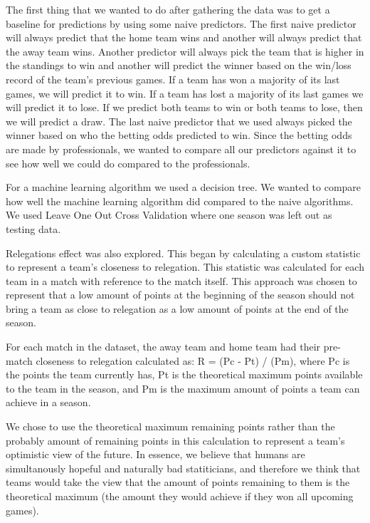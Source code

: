 \documentclass[conference]{IEEEtran}
\begin{document}
The first thing that we wanted to do after gathering the data was to get a baseline for predictions by using some naive predictors. The first naive predictor will always predict that the home team wins and another will always predict that the away team wins. Another predictor will always pick the team that is higher in the standings to win and another will predict the winner based on the win/loss record of the team's previous games. If a team has won a majority of its last games, we will predict it to win. If a team has lost a majority of its last games we will predict it to lose. If we predict both teams to win or both teams to lose, then we will predict a draw. The last naive predictor that we used always picked the winner based on who the betting odds predicted to win. Since the betting odds are made by professionals, we wanted to compare all our predictors against it to see how well we could do compared to the professionals.

For a machine learning algorithm we used a decision tree. We wanted to compare how well the machine learning algorithm did compared to the naive algorithms. We used Leave One Out Cross Validation where one season was left out as testing data.

Relegations effect was also explored. This began by calculating a custom statistic to represent a team's closeness to relegation. This statistic was calculated for each team in a match with reference to the match itself. This approach was chosen to represent that a low amount of points at the beginning of the season should not bring a team as close to relegation as a low amount of points at the end of the season.

For each match in the dataset, the away team and home team had their pre-match closeness to relegation calculated as: R = (Pc - Pt) / (Pm), where Pc is the points the team currently has, Pt is the theoretical maximum points available to the team in the season, and Pm is the maximum amount of points a team can achieve in a season. 

We chose to use the theoretical maximum remaining points rather than the probably amount of remaining points in this calculation to represent a team's optimistic view of the future. In essence, we believe that humans are simultanously hopeful and naturally bad statiticians, and therefore we think that teams would take the view that the amount of points remaining to them is the theoretical maximum (the amount they would achieve if they won all upcoming games). 
\end{document}
